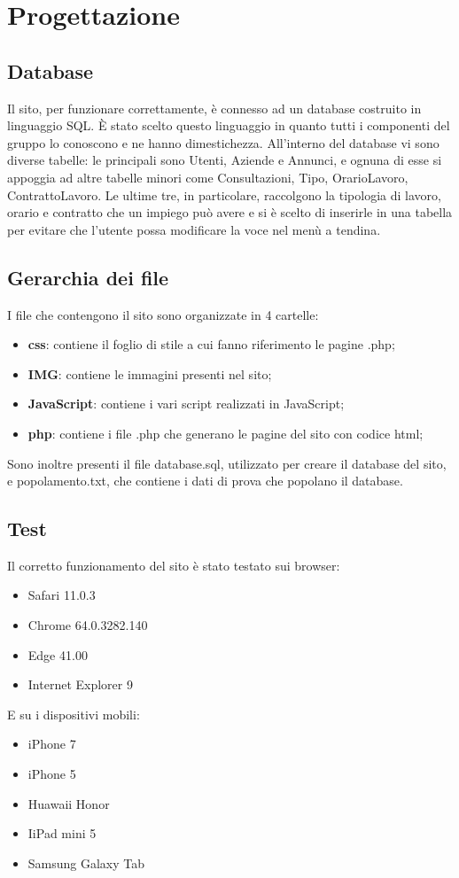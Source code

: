 \section{Progettazione}
	\subsection{Database}
Il sito, per funzionare correttamente, è connesso ad un database costruito in linguaggio SQL. È stato scelto questo linguaggio in quanto tutti i componenti del gruppo lo conoscono e ne hanno dimestichezza. 
All'interno del database vi sono diverse tabelle: le principali sono Utenti, Aziende e Annunci, e ognuna di esse si appoggia ad altre tabelle minori come Consultazioni, Tipo, OrarioLavoro, ContrattoLavoro. Le ultime tre, in particolare, raccolgono la tipologia di lavoro, orario e contratto che un impiego può avere e si è scelto di inserirle in una tabella per evitare che l'utente possa modificare la voce nel menù a tendina.   

\subsection{Gerarchia dei file}
I file che contengono il sito sono organizzate in 4 cartelle: 
\begin{itemize}
	\item \textbf{css}: contiene il foglio di stile a cui fanno riferimento le pagine .php;
	\item \textbf{IMG}: contiene le immagini presenti nel sito;
	\item \textbf{JavaScript}: contiene i vari script realizzati in JavaScript;
	\item \textbf{php}: contiene i file .php che generano le pagine del sito con codice html;
\end{itemize}
Sono inoltre presenti il file database.sql, utilizzato per creare il database del sito, e popolamento.txt, che contiene i dati di prova che popolano il database.


\subsection{Test}
Il corretto funzionamento del sito è stato testato sui browser:
\begin{itemize}
	\item Safari 11.0.3
	\item Chrome 64.0.3282.140
	\item Edge 	41.00
	\item Internet Explorer 9
\end{itemize}
E su i dispositivi mobili:
\begin{itemize}
	\item iPhone 7
	\item iPhone 5
	\item Huawaii Honor
	\item IiPad mini 5
	\item Samsung Galaxy Tab
\end{itemize}